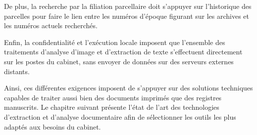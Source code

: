 De plus, la recherche par la filiation parcellaire doit s'appuyer sur l'historique des parcelles pour faire le lien entre les numéros d'époque figurant sur les archives et les numéros actuels recherchés.

Enfin, la confidentialité et l'exécution locale imposent que l'ensemble des traitements d'analyse d'image et d'extraction de texte s'effectuent directement sur les postes du cabinet, sans envoyer de données sur des serveurs externes distants.


Ainsi, ces différentes exigences imposent de s'appuyer sur des solutions techniques capables de traiter aussi bien des documents imprimés que des registres manuscrits. Le chapitre suivant présente l'état de l'art des technologies d'extraction et d'analyse documentaire afin de sélectionner les outils les plus adaptés aux besoins du cabinet.
